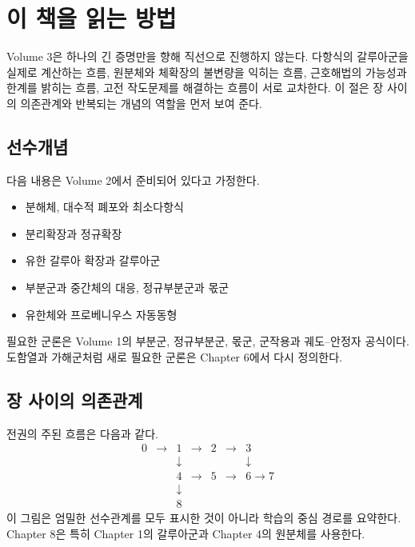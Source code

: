 \chapter*{이 책을 읽는 방법}

Volume 3은 하나의 긴 증명만을 향해 직선으로 진행하지 않는다. 다항식의 갈루아군을 실제로 계산하는 흐름, 원분체와 체확장의 불변량을 익히는 흐름, 근호해법의 가능성과 한계를 밝히는 흐름, 고전 작도문제를 해결하는 흐름이 서로 교차한다. 이 절은 장 사이의 의존관계와 반복되는 개념의 역할을 먼저 보여 준다.

\section*{선수개념}

다음 내용은 Volume 2에서 준비되어 있다고 가정한다.
\begin{itemize}
  \item 분해체, 대수적 폐포와 최소다항식
  \item 분리확장과 정규확장
  \item 유한 갈루아 확장과 갈루아군
  \item 부분군과 중간체의 대응, 정규부분군과 몫군
  \item 유한체와 프로베니우스 자동동형
\end{itemize}
필요한 군론은 Volume 1의 부분군, 정규부분군, 몫군, 군작용과 궤도--안정자 공식이다. 도함열과 가해군처럼 새로 필요한 군론은 Chapter 6에서 다시 정의한다.

\section*{장 사이의 의존관계}

전권의 주된 흐름은 다음과 같다.
\[
\begin{array}{ccccccc}
0&\longrightarrow&1&\longrightarrow&2&\longrightarrow&3\\
&&\downarrow&&&&\downarrow\\
&&4&\longrightarrow&5&\longrightarrow&6\longrightarrow7\\
&&\downarrow\\
&&8
\end{array}
\]
이 그림은 엄밀한 선수관계를 모두 표시한 것이 아니라 학습의 중심 경로를 요약한다. Chapter 8은 특히 Chapter 1의 갈루아군과 Chapter 4의 원분체를 사용한다.

